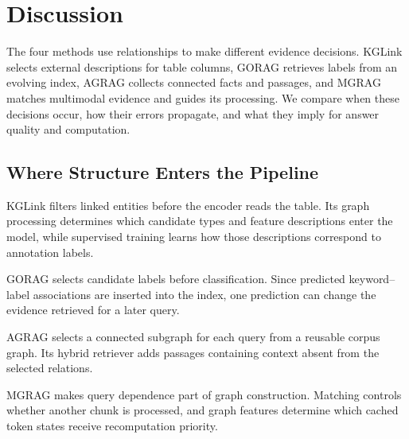 \chapter{Discussion}
\label{ch:discussion}

The four methods use relationships to make different evidence decisions. KGLink selects external descriptions for table columns, GORAG retrieves labels from an evolving index, AGRAG collects connected facts and passages, and MGRAG matches multimodal evidence and guides its processing. We compare when these decisions occur, how their errors propagate, and what they imply for answer quality and computation.

\section{Where Structure Enters the Pipeline}
\label{sec:discussion:pipeline}
KGLink filters linked entities before the encoder reads the table. Its graph processing determines which candidate types and feature descriptions enter the model, while supervised training learns how those descriptions correspond to annotation labels.

GORAG selects candidate labels before classification. Since predicted keyword--label associations are inserted into the index, one prediction can change the evidence retrieved for a later query.

AGRAG selects a connected subgraph for each query from a reusable corpus graph. Its hybrid retriever adds passages containing context absent from the selected relations.

\begin{samepage}
MGRAG makes query dependence part of graph construction. Matching controls whether another chunk is processed, and graph features determine which cached token states receive recomputation priority.\par
\end{samepage}

